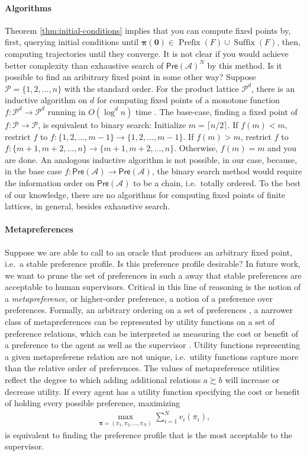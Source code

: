 \documentclass[conference]{ieeeconf}
\newcommand{\A}{\mathcal{A}}
\renewcommand{\P}{\mathcal{P}}
\newcommand{\Pref}{\mathsf{Pre}}
\newcommand{\prefers}{\succsim}
\newcommand{\profile}{\boldsymbol{\pi}}
\DeclareMathOperator{\Pre}{Prefix}
\DeclareMathOperator{\Post}{Suffix}
\begin{document}
\paragraph*{Algorithms}
Theorem \ref{thm:initial-conditions} implies that you can compute fixed points by, first, querying initial conditions until $\boldsymbol{\pi(0)} \in \Pre(F) \cup \Post(F)$, then, computing trajectories until they converge. It is not clear if you would achieve better complexity than exhaustive search of $\Pref(\A)^N$ by this method. Is it possible to find an aribitrary fixed point in some other way? Suppose $\P = \{1,2,\dots,n\}$ with the standard order. For the product lattice $\P^d$, there is an inductive algorithm on $d$ for computing fixed points of a monotone function $f: \P^d \to \P^d$ running in $O(\log^d n)$ time \cite{?}. The base-case, finding a fixed point of $f: \P \to \P$, is equivalent to binary search: Initialize $m = \lceil n/2 \rceil$. If $f(m) < m$, restrict $f$ to $f: \{1,2,\dots,m-1\} \to \{1,2,\dots,m-1\}$. If $f(m) > m$, restrict $f$ to $f: \{m+1,m+2,\dots,n\} \to \{m+1,m+2,\dots,n\}$. Otherwise, $f(m) = m$ and you are done. An analogous inductive algorithm is not possible, in our case, because, in the base case $f: \Pref(\A) \to \Pref(\A)$, the binary search method would require the information order on $\Pref(\A)$ to be a chain, i.e.~totally ordered. To the best of our knowledge, there are no algorithms for computing fixed points of finite lattices, in general, besides exhaustive search.

\paragraph*{Metapreferences}
Suppose we are able to call to an oracle that produces an arbitrary fixed point, i.e.~a stable preference profile. Is this preference profile desirable? In future work, we want to prune the set of preferences in such a away that stable preferences are acceptable to human supervisors. Critical in this line of reasoning is the notion of a \emph{metapreference},  or higher-order preference, a notion of a preference over preferences. Formally, an arbitrary ordering on a set of preferences \cite{lutskanov2015}, a narrower class of metapreferences can be represented by utility functions on a set of preference relations, which can be interpreted as measuring the cost or benefit of a preference to the agent as well as the supervisor \cite{munger2019}. Utility functions representing a given metapreferene relation are not unique, i.e.~utility functions capture more than the relative order of preferences. The values of metapreference utilities reflect the degree to which adding additional relations $a \prefers b$ will increase or decrease utility. If every agent has a utility function specifying the cost or benefit of holding every possible preference, maximizing
\begin{align}
    \max_{\profile = (\pi_1,\pi_2,\dots,\pi_N)} \sum_{i=1}^N v_i(\pi_i), \label{eq:dist-opt}
\end{align}
is equivalent to finding the preference profile that is the most acceptable to the supervisor.
\end{document}
